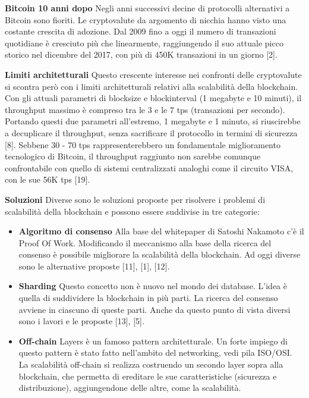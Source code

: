 \documentclass[12pt,italian,]{book}
\providecommand{\tightlist}{%
  \setlength{\itemsep}{0pt}\setlength{\parskip}{0pt}}
\begin{document}
\textbf{\textbf{Bitcoin 10 anni dopo}} Negli anni successivi decine di protocolli alternativi a Bitcoin sono fioriti. Le cryptovalute da argomento di nicchia hanno visto una costante crescita di adozione. Dal 2009 fino a oggi il numero di transazioni quotidiane è cresciuto più che linearmente, raggiungendo il suo attuale picco storico nel dicembre del 2017, con più di 450K transazioni in un giorno {[}2{]}.

\textbf{\textbf{Limiti architetturali}} Questo crescente interesse nei confronti delle cryptovalute si scontra però con i limiti architetturali relativi alla scalabilità della blockchain. Con gli attuali parametri di blocksize e blockinterval (1 megabyte e 10 minuti), il throughput massimo è compreso tra le 3 e le 7 tps (transazioni per secondo). Portando questi due parametri all'estremo, 1 megabyte e 1 minuto, si riuscirebbe a decuplicare il throughput, senza sacrificare il protocollo in termini di sicurezza {[}8{]}. Sebbene 30 - 70 tps rappresenterebbero un fondamentale miglioramento tecnologico di Bitcoin, il throughput raggiunto non sarebbe comunque confrontabile con quello di sistemi centralizzati analoghi come il circuito VISA, con le sue 56K tps {[}19{]}.

\textbf{\textbf{Soluzioni}} Diverse sono le soluzioni proposte per risolvere i problemi di scalabilità della blockchain e possono essere suddivise in tre categorie:

\begin{itemize}
\tightlist
\item
  \textbf{Algoritmo di consenso} Alla base del whitepaper di Satoshi Nakamoto c'è il Proof Of Work. Modificando il meccanismo alla base della ricerca del consenso è possibile migliorare la scalabilità della blockchain. Ad oggi diverse sono le alternative proposte {[}11{]}, {[}1{]}, {[}12{]}.
\item
  \textbf{Sharding} Questo concetto non è nuovo nel mondo dei database. L'idea è quella di suddividere la blockchain in più parti. La ricerca del consenso avviene in ciascuno di queste parti. Anche da questo punto di vista diversi sono i lavori e le proposte {[}13{]}, {[}5{]}.
\item
  \textbf{Off-chain} Layers è un famoso pattern architetturale. Un forte impiego di questo pattern è stato fatto nell'ambito del networking, vedi pila ISO/OSI. La scalabilità off-chain si realizza costruendo un secondo layer sopra alla blockchain, che permetta di ereditare le sue caratteristiche (sicurezza e distribuzione), aggiungendone delle altre, come la scalabilità.
\end{itemize}
\end{document}
